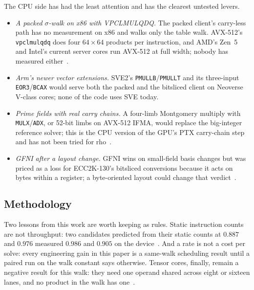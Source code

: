 The CPU side has had the least attention and has the clearest
untested levers.
\begin{itemize}[leftmargin=1.2em,itemsep=0.2em]
\item \emph{A packed $\sigma$-walk on x86 with VPCLMULQDQ.} The packed
  client's carry-less path has no measurement on x86 and walks only the
  table walk. AVX-512's \texttt{vpclmulqdq} does four
  $64\times64$ products per instruction, and AMD's Zen~5 and Intel's
  current server cores run AVX-512 at full width; nobody has measured
  either~.
\item \emph{Arm's newer vector extensions.} SVE2's \texttt{PMULLB}/\texttt{PMULLT}
  and its three-input \texttt{EOR3}/\texttt{BCAX} would serve both the
  packed and the bitsliced client on Neoverse V-class cores; none of
  the code uses SVE today.
\item \emph{Prime fields with real carry chains.} A four-limb Montgomery
  multiply with \texttt{MULX}/\texttt{ADX}, or 52-bit limbs on AVX-512
  IFMA, would replace the big-integer reference solver; this is the CPU
  version of the GPU's PTX carry-chain step and has not been tried for
  rho~.
\item \emph{GFNI after a layout change.} GFNI wins on small-field basis
  changes but was priced as a loss for ECC2K-130's bitsliced conversions
  because it acts on bytes within a register; a byte-oriented layout
  could change that verdict~.
\end{itemize}

\subsection{Methodology}
\label{sec:open-method}

Two lessons from this work are worth keeping as rules. Static
instruction counts are not throughput: two candidates predicted from
their static counts at $0.887$ and $0.976$ measured $0.986$ and $0.905$ on
the device~.
And a rate is not a cost per solve: every engineering gain in this
paper is a same-walk scheduling result until a paired run on the walk
constant says otherwise. Tensor cores, finally, remain a negative
result for this walk: they need one operand shared across eight or
sixteen lanes, and no product in the walk has
one~.
